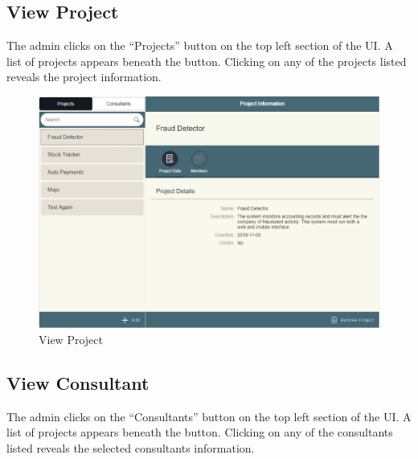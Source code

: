 \documentclass[a4paper, 12pt, oneside]{article}
\begin{document}
\subsection{View Project}

The admin clicks on the “Projects” button on the top left section of the UI. A list of projects appears beneath the button. Clicking on any of the projects listed reveals the project information.

\begin{figure}[h]

  \centering

  \includegraphics[width=\linewidth]{images/viewProject.PNG}

  \caption{View Project}

  \label{fig:sfig1}

\end{figure}

\subsection{View Consultant}

The admin clicks on the “Consultants” button on the top left section of the UI. A list of projects appears beneath the button. Clicking on any of the consultants listed reveals the selected consultants information.
\end{document}
